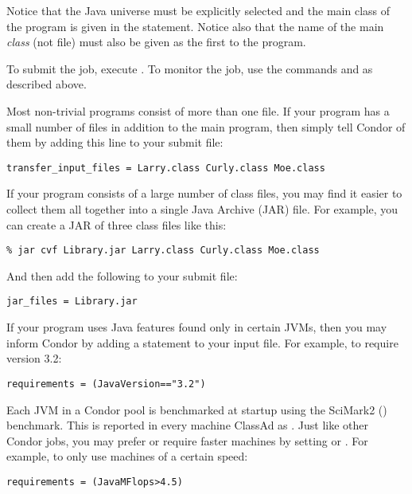 Notice that the Java universe must be explicitly selected and the main class
of the program is given in the  statement.  Notice also that
the name of the main \emph{class} (not file) must also be given as the first
 to the program.

To submit the job, execute  .
To monitor the job, use the commands  and 
as described above.

Most non-trivial programs consist of more than one  file.
If your program has a small number of  files in addition
to the main program, then simply tell Condor of them by adding
this line to your submit file:

\begin{verbatim}
transfer_input_files = Larry.class Curly.class Moe.class
\end{verbatim}

If your program consists of a large number of class files,
you may find it easier to collect them all together into
a single Java Archive (JAR) file.  For example, you
can create a JAR of three class files like this:

\begin{verbatim}
% jar cvf Library.jar Larry.class Curly.class Moe.class
\end{verbatim}

And then add the following to your submit file:

\begin{verbatim}
jar_files = Library.jar
\end{verbatim}

If your program uses Java features found only in certain
JVMs, then you may inform Condor by adding a 
statement to your input file.  For example, to require
version 3.2:

\begin{verbatim}
requirements = (JavaVersion=="3.2")
\end{verbatim}

Each JVM in a Condor pool is benchmarked at startup using the SciMark2
() benchmark.  This is reported in
every machine ClassAd as .  Just like other Condor jobs,
you may prefer or require faster machines by setting  or
.  For example, to only use machines of a certain speed:

\begin{verbatim}
requirements = (JavaMFlops>4.5)
\end{verbatim}


